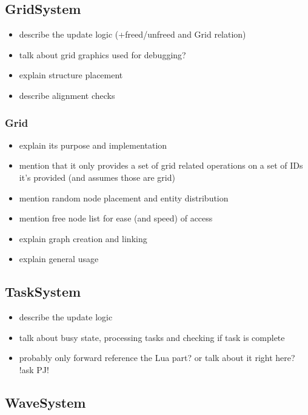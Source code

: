 \subsection{GridSystem}

\begin{itemize}
    \item describe the update logic (+freed/unfreed and Grid relation)
    \item talk about grid graphics used for debugging?
    \item explain structure placement
    \item describe alignment checks
\end{itemize}

\subsubsection{Grid}

\begin{itemize}
    \item explain its purpose and implementation
    \item mention that it only provides a set of grid related operations
        on a set of IDs it's provided (and assumes those are grid)
    \item mention random node placement and entity distribution
    \item mention free node list for ease (and speed) of access
    \item explain graph creation and linking
    \item explain general usage
\end{itemize}

\subsection{TaskSystem}

\begin{itemize}
    \item describe the update logic
    \item talk about busy state, processing tasks and checking if task is complete
    \item probably only forward reference the Lua part? or talk about it right here? !ask PJ!
\end{itemize}

\subsection{WaveSystem}

